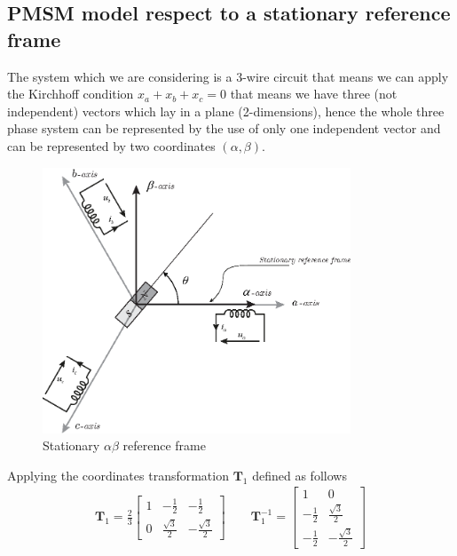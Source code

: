 \documentclass[11pt,a4paper]{article}
\numberwithin{equation}{section}
\theoremstyle{it}
\theoremstyle{definition}
\begin{document}
\begin{onehalfspace}
\subsection{PMSM model respect to a stationary reference frame}
The system which we are considering is a 3-wire circuit that means we can apply the Kirchhoff condition $x_a+x_b+x_c=0$ that means we have three (not independent) vectors which lay in a plane (2-dimensions), hence the whole three phase system can be represented by the use of only one independent vector and can be represented by two coordinates $(\alpha,\beta)$.
\begin{figure}[H]
	\centering
	\includegraphics[width = 260pt, keepaspectratio]{figures/pmsm/reference_frames_ab.eps}
	\captionsetup{width=0.5\textwidth, font=small} 
	\caption	{Stationary $\alpha\beta$ reference frame}
	\label{figure:reference_frames}
\end{figure}
Applying the coordinates transformation $\mathbf{T}_1$ defined as follows
\begin{equation}
	\begin{aligned}
		\mathbf{T}_1 = 
		\frac{2}{3}\begin{bmatrix}
			1 & -\frac{1}{2} & -\frac{1}{2} \\[6pt]
			0 & \frac{\sqrt{3}}{2} & -\frac{\sqrt{3}}{2} 
		\end{bmatrix} \qquad
		\mathbf{T}_1^{-1} = 
		\begin{bmatrix}
			1 & 0 \\[6pt]
			-\frac{1}{2} & \frac{\sqrt{3}}{2} \\[6pt]
			-\frac{1}{2} & -\frac{\sqrt{3}}{2} 
		\end{bmatrix}
	\end{aligned} 
\end{equation}
\begin{equation}

\end{equation}
\end{onehalfspace}
\end{document}
